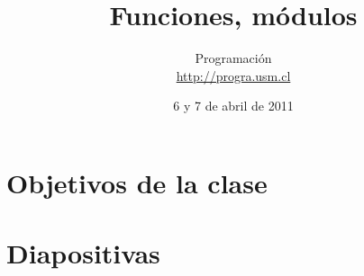 \documentclass[10pt]{article}
\title{Funciones, módulos}
\author{Programación \\ \url{http://progra.usm.cl}}
\date{6 y 7 de abril de 2011}
\begin{document}
  \maketitle

  \section*{Objetivos de la clase}

  \section*{Diapositivas}
\end{document}
